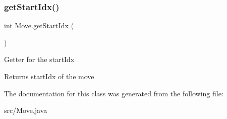 \subsubsection{\texorpdfstring{get\+Start\+Idx()}{getStartIdx()}}
{\footnotesize\ttfamily int Move.\+get\+Start\+Idx (\begin{DoxyParamCaption}{ }\end{DoxyParamCaption})}

Getter for the start\+Idx \begin{DoxyReturn}{Returns}
start\+Idx of the move 
\end{DoxyReturn}


The documentation for this class was generated from the following file\+:\begin{DoxyCompactItemize}
\item 
src/Move.\+java\end{DoxyCompactItemize}
